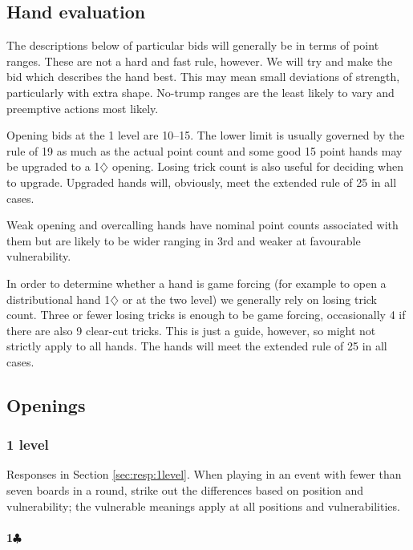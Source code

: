 \documentclass[a4paper,14pt]{extarticle}
\begin{document}
\subsection{Hand evaluation}

The descriptions below of particular bids will generally be in terms of point
ranges. These are not a hard and fast rule, however. We will try and make the
bid which describes the hand best. This may mean small deviations of strength, 
particularly with extra shape. No-trump ranges are the least likely to vary and
preemptive actions most likely.

Opening bids at the 1 level are 10--15. The lower limit is usually governed by
the rule of 19 as much as the actual point count and some good 15 point hands
may be upgraded to a 1$\diamondsuit$ opening. Losing trick count is also 
useful for deciding when to upgrade. Upgraded hands will, obviously, meet the
extended rule of 25 in all cases. 

Weak opening and overcalling hands have nominal point counts associated with
them but are likely to be wider ranging in 3rd and weaker at favourable
vulnerability.

In order to determine whether a hand is game forcing (for example to open a
distributional hand 1$\diamondsuit$ or at the two level) we generally
rely on losing trick count. Three or fewer losing tricks is enough to be game
forcing, occasionally 4 if there are also 9 clear-cut tricks. This is just a
guide, however, so might not strictly apply to all hands. The hands will meet
the extended rule of 25 in all cases.

\newpage

\subsection{Openings}
\label{sec:openings}

\subsubsection{1 level}
\label{sec:open:1level}

Responses in Section \ref{sec:resp:1level}. When playing in an event with fewer
than seven boards in a round, strike out the differences based on position and
vulnerability; the vulnerable meanings apply at all positions and
vulnerabilities.

\paragraph{1$\clubsuit$}
\end{document}
